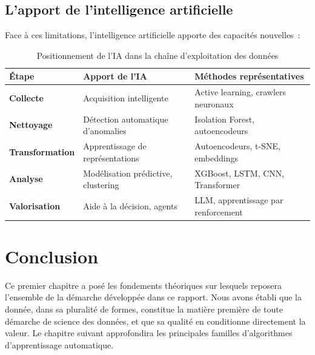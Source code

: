 \subsection{L'apport de l'intelligence artificielle}

Face à ces limitations, l'intelligence artificielle apporte des capacités nouvelles~:

\begin{table}[H]
\centering
\caption{Positionnement de l'IA dans la chaîne d'exploitation des données}
\label{tab:positionnement-ia}
\renewcommand{\arraystretch}{1.4}
\begin{tabularx}{\textwidth}{|>{\bfseries}p{2.5cm}|p{4cm}|X|}
\hline
\rowcolor{maingreen!15}\textbf{Étape} & \textbf{Apport de l'IA} & \textbf{Méthodes représentatives} \\
\hline
Collecte & Acquisition intelligente & Active learning, crawlers neuronaux \\
\hline
Nettoyage & Détection automatique d'anomalies & Isolation Forest, autoencodeurs \\
\hline
Transformation & Apprentissage de représentations & Autoencodeurs, t-SNE, embeddings \\
\hline
Analyse & Modélisation prédictive, clustering & XGBoost, LSTM, CNN, Transformer \\
\hline
Valorisation & Aide à la décision, agents & LLM, apprentissage par renforcement \\
\hline
\end{tabularx}
\end{table}

\section{Conclusion}

Ce premier chapitre a posé les fondements théoriques sur lesquels reposera l'ensemble de la démarche développée dans ce rapport. Nous avons établi que la donnée, dans sa pluralité de formes, constitue la matière première de toute démarche de science des données, et que sa qualité en conditionne directement la valeur. Le chapitre suivant approfondira les principales familles d'algorithmes d'apprentissage automatique.

\newpage
